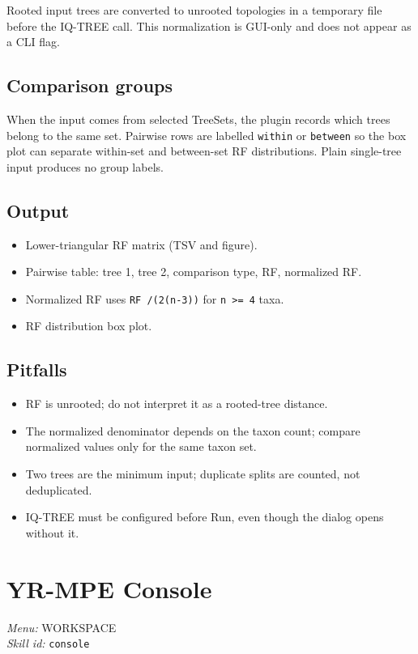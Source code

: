 \documentclass[11pt]{report}
\begin{document}
Rooted input trees are converted to unrooted topologies in a temporary file before the IQ-TREE call. This normalization is GUI-only and does not appear as a CLI flag.

\subsection{Comparison groups}

When the input comes from selected TreeSets, the plugin records which trees belong to the same set. Pairwise rows are labelled \texttt{within} or \texttt{between} so the box plot can separate within-set and between-set RF distributions. Plain single-tree input produces no group labels.

\subsection{Output}

\begin{itemize}
  \item Lower-triangular RF matrix (TSV and figure).
  \item Pairwise table: tree 1, tree 2, comparison type, RF, normalized RF.
  \item Normalized RF uses \texttt{RF /\allowbreak  \allowbreak (2\allowbreak (n-3))} for \texttt{n >= 4} taxa.
  \item RF distribution box plot.
\end{itemize}

\subsection{Pitfalls}

\begin{itemize}
  \item RF is unrooted; do not interpret it as a rooted-tree distance.
  \item The normalized denominator depends on the taxon count; compare normalized values only for the same taxon set.
  \item Two trees are the minimum input; duplicate splits are counted, not deduplicated.
  \item IQ-TREE must be configured before Run, even though the dialog opens without it.
\end{itemize}


\section{YR-MPE Console}
\noindent\textit{Menu:} WORKSPACE\\
\noindent\textit{Skill id:} \texttt{console}
\end{document}
